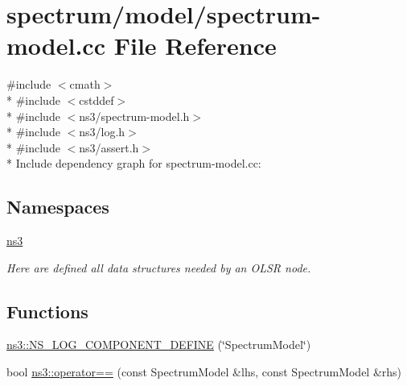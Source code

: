 \hypertarget{spectrum-model_8cc}{}\section{spectrum/model/spectrum-\/model.cc File Reference}
\label{spectrum-model_8cc}
{\ttfamily \#include $<$cmath$>$}\\*
{\ttfamily \#include $<$cstddef$>$}\\*
{\ttfamily \#include $<$ns3/spectrum-\/model.\+h$>$}\\*
{\ttfamily \#include $<$ns3/log.\+h$>$}\\*
{\ttfamily \#include $<$ns3/assert.\+h$>$}\\*
Include dependency graph for spectrum-\/model.cc\+:
\subsection*{Namespaces}
\begin{DoxyCompactItemize}
\item 
 \hyperlink{namespacens3}{ns3}
\begin{DoxyCompactList}\small\item\em Here are defined all data structures needed by an O\+L\+SR node. \end{DoxyCompactList}\end{DoxyCompactItemize}
\subsection*{Functions}
\begin{DoxyCompactItemize}
\item 
\hyperlink{namespacens3_aa06a8a253baa286262772815ca014b27}{ns3\+::\+N\+S\+\_\+\+L\+O\+G\+\_\+\+C\+O\+M\+P\+O\+N\+E\+N\+T\+\_\+\+D\+E\+F\+I\+NE} (\char`\"{}Spectrum\+Model\char`\"{})
\item 
bool \hyperlink{namespacens3_ac9b8b0328e8093728031ee63d78eeef9}{ns3\+::operator==} (const Spectrum\+Model \&lhs, const Spectrum\+Model \&rhs)
\end{DoxyCompactItemize}
